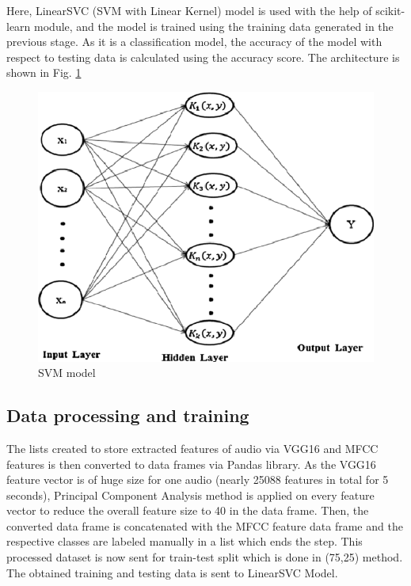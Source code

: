 \documentclass[pdflatex]{sn-jnl}%
\theoremstyle{thmstyleone}%
\theoremstyle{thmstyletwo}%
\theoremstyle{thmstylethree}%
\begin{document}
Here, LinearSVC (SVM with Linear Kernel) model is used with the help of scikit-learn module, and the model is trained using the training data generated in the previous stage.
As it is a classification model, the accuracy of the model with respect to testing data is calculated using the accuracy score. The architecture is shown in Fig. \ref{svm}

\begin{figure}[htbp]
	\centerline{\includegraphics[scale=0.3]{dd.png}}
	\caption{SVM model \cite{b23}}
	\label{svm}
\end{figure}

\subsection{Data processing and training}
The lists created to store extracted features of audio via
VGG16 and MFCC features is then converted to data frames
via Pandas library. As the VGG16 feature vector is of huge
size for one audio (nearly 25088 features in total for 5 seconds), Principal Component Analysis method is
applied on every feature vector to reduce the overall feature
size to 40 in the data frame.
Then, the converted data frame is concatenated with the
MFCC feature data frame and the respective classes are labeled
manually in a list which ends the step. This processed dataset
is now sent for train-test split which is done in (75,25) method.
The obtained training and testing data is sent to LinearSVC
Model.
\end{document}
